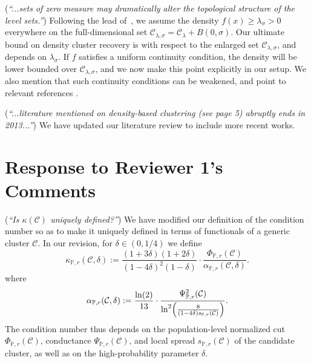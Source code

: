\documentclass{article}
\newcommand{\1}{\mathbf{1}}
\newcommand{\mc}[1]{\mathcal{#1}}
\newcommand{\Pbb}{\mathbb{P}}
\theoremstyle{alden}
\theoremstyle{aldenthm}
\theoremstyle{definition}
\theoremstyle{remark}
\begin{document}
(\textit{``...sets of zero measure may dramatically alter the topological structure of the level sets.''}) Following the lead of~\citet{chaudhuri2010}, we assume the density $f(x) \geq \lambda_{\sigma} > 0$ everywhere on the full-dimensional set $\mc{C}_{\lambda,\sigma} = \mc{C}_{\lambda} + B(0,\sigma)$. Our ultimate bound on density cluster recovery is with respect to the enlarged set $\mc{C}_{\lambda,\sigma}$, and depends on $\lambda_{\sigma}$. If $f$ satisfies a uniform continuity condition, the density will be lower bounded over $\mc{C}_{\lambda,\sigma}$, and we now make this point explicitly in our setup. We also mention that such continuity conditions can be weakened, and point to relevant references \citep{rinaldo2010, steinwart2015}.

(\textit{``...literature mentioned on density-based clustering (see page 5) abruptly ends in 2013...''}) We have updated our literature review to include more recent works.

\section{Response to Reviewer 1's Comments}

(\textit{``Is $\kappa(\mc{C})$ uniquely defined?''}) We have modified our definition of the condition number so as to make it uniquely defined in terms of functionals of a generic cluster $\mc{C}$. In our revision, for $\delta \in (0,1/4)$ we define
\begin{equation*}
\kappa_{\Pbb,r}(\mc{C},\delta) := \frac{(1 + 3\delta)(1+2\delta)}{(1 - 4\delta)^2(1 - \delta)} \cdot \frac{\Phi_{\Pbb,r}(\mc{C})}{\alpha_{\Pbb,r}(\mc{C},\delta)}.
\end{equation*}
where
\begin{equation*}
\alpha_{\Pbb,r}(\mc{C},\delta) := \frac{\ln(2)}{13} \cdot \frac{\Psi_{\Pbb,r}^2(\mc{C})}{\ln^2\Bigl(\frac{8}{(1 - 4\delta)s_{\Pbb,r}(\mc{C})}\Bigr)}.
\end{equation*}
The condition number thus depends on the population-level normalized cut $\Phi_{\Pbb,r}(\mc{C})$, conductance $\Psi_{\Pbb,r}(\mc{C})$, and local spread $s_{\Pbb,r}(\mc{C})$ of the candidate cluster, as well as on the high-probability parameter $\delta$. 
\end{document}
